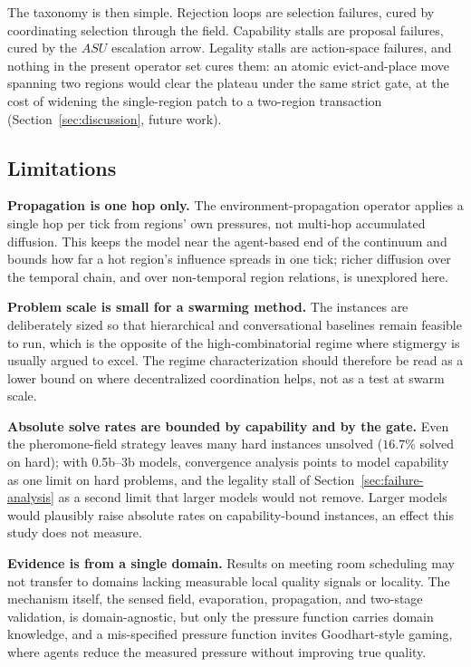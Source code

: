The taxonomy is then simple. Rejection loops are selection failures, cured by coordinating selection through the field. Capability stalls are proposal failures, cured by the $ASU$ escalation arrow. Legality stalls are action-space failures, and nothing in the present operator set cures them: an atomic evict-and-place move spanning two regions would clear the plateau under the same strict gate, at the cost of widening the single-region patch to a two-region transaction (Section~\ref{sec:discussion}, future work).

\subsection{Limitations}

\textbf{Propagation is one hop only.} The environment-propagation operator applies a single hop per tick from regions' own pressures, not multi-hop accumulated diffusion. This keeps the model near the agent-based end of the continuum and bounds how far a hot region's influence spreads in one tick; richer diffusion over the temporal chain, and over non-temporal region relations, is unexplored here.

\textbf{Problem scale is small for a swarming method.} The instances are deliberately sized so that hierarchical and conversational baselines remain feasible to run, which is the opposite of the high-combinatorial regime where stigmergy is usually argued to excel. The regime characterization should therefore be read as a lower bound on where decentralized coordination helps, not as a test at swarm scale.

\textbf{Absolute solve rates are bounded by capability and by the gate.} Even the pheromone-field strategy leaves many hard instances unsolved ($16.7\%$ solved on hard); with 0.5b--3b models, convergence analysis points to model capability as one limit on hard problems, and the legality stall of Section~\ref{sec:failure-analysis} as a second limit that larger models would not remove. Larger models would plausibly raise absolute rates on capability-bound instances, an effect this study does not measure.

\textbf{Evidence is from a single domain.} Results on meeting room scheduling may not transfer to domains lacking measurable local quality signals or locality. The mechanism itself, the sensed field, evaporation, propagation, and two-stage validation, is domain-agnostic, but only the pressure function carries domain knowledge, and a mis-specified pressure function invites Goodhart-style gaming, where agents reduce the measured pressure without improving true quality.

